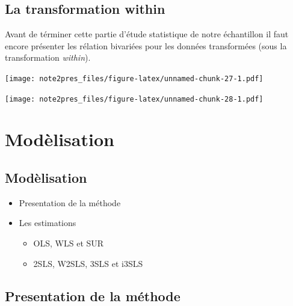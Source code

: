 \documentclass[11pt,]{article}
\providecommand{\tightlist}{%
  \setlength{\itemsep}{0pt}\setlength{\parskip}{0pt}}
\begin{document}
\FloatBarrier

\hypertarget{la-transformation-within}{%
\subsection{\texorpdfstring{La transformation
\textbf{within}}{La transformation within}}\label{la-transformation-within}}

Avant de términer cette partie d'étude statistique de notre échantillon
il faut encore présenter les rélation bivariées pour les données
transformées (sous la transformation \emph{within}).

\FloatBarrier

\texttt{[image: note2pres\_files/figure-latex/unnamed-chunk-27-1.pdf]}

\FloatBarrier

\texttt{[image: note2pres\_files/figure-latex/unnamed-chunk-28-1.pdf]}

\FloatBarrier

\hypertarget{modelisation}{%
\section{Modèlisation}\label{modelisation}}

\FloatBarrier

\FloatBarrier

\hypertarget{modelisation-1}{%
\subsection{Modèlisation}\label{modelisation-1}}

\begin{itemize}
\tightlist
\item
  Presentation de la méthode
\item
  Les estimations

  \begin{itemize}
  \tightlist
  \item
    OLS, WLS et SUR
  \item
    2SLS, W2SLS, 3SLS et i3SLS
  \end{itemize}
\end{itemize}

\FloatBarrier

\hypertarget{presentation-de-la-methode}{%
\subsection{Presentation de la
méthode}\label{presentation-de-la-methode}}
\end{document}
